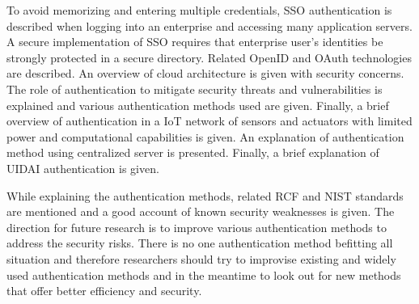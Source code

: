 \begin{multicols}{2}
To avoid memorizing and entering multiple credentials, SSO authentication is described when logging into an enterprise and accessing many application servers. A secure implementation of SSO requires that enterprise user's identities be strongly protected in a secure directory. Related OpenID and OAuth technologies are described. An overview of cloud architecture is given with security concerns. The role of authentication to mitigate security threats and vulnerabilities is explained and various authentication methods used are given. Finally, a brief overview of authentication in a IoT network of sensors and actuators with limited power and computational capabilities is given. An explanation of authentication method using centralized server is presented. Finally, a brief explanation of UIDAI authentication is given.

While explaining the authentication methods, related RCF and NIST standards are mentioned and a good account of known security weaknesses is given. The direction for future research is to improve various authentication methods to address the security risks. There is no one authentication method befitting all situation and therefore researchers should try to improvise existing and widely used authentication methods and in the meantime to look out for new methods that offer better efficiency and security.


\end{multicols}
